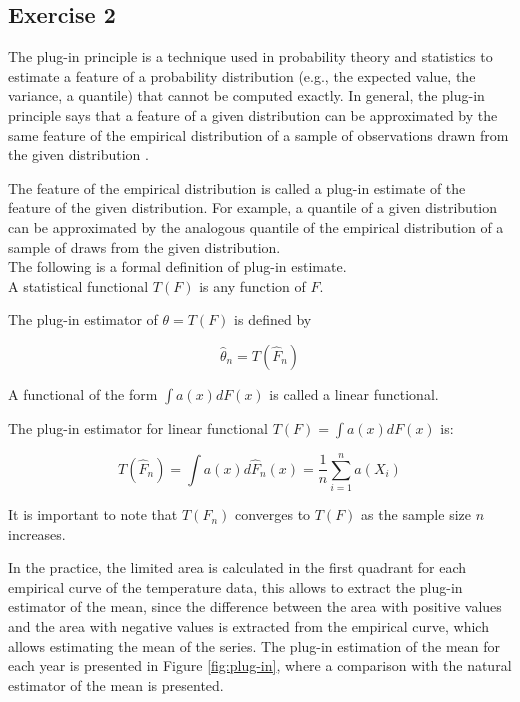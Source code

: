 \documentclass[11pt]{article}
\theoremstyle{definition}
\theoremstyle{remark}
\theoremstyle{remark}
\begin{document}
\subsection*{Exercise 2}

The plug-in principle is a technique used in probability theory and
statistics to estimate a feature of a probability distribution (e.g.,
the expected value, the variance, a quantile) that cannot be computed
exactly. In general, the plug-in principle says that a feature of a
given distribution can be approximated by the same feature of the
empirical distribution of a sample of observations drawn from the
given distribution \cite{van2000asymptotic}.

The feature of the empirical distribution is called a plug-in estimate
of the feature of the given distribution. For example, a quantile of a
given distribution can be approximated by the analogous quantile of
the empirical distribution of a sample of draws from the given
distribution.
\\

The following is a formal definition of plug-in estimate.
\\

A statistical functional $T(F)$ is any function of $F$.

The plug-in estimator of $\theta=T(F)$ is defined by

\[
  \widehat{\theta}_{n}=T\left(\widehat{F}_{n}\right)
\]

A functional of the form $\int a(x) d F(x)$ is called a linear
functional.

The plug-in estimator for linear functional $T(F)=\int a(x) d F(x)$
is:

\[
  T\left(\widehat{F}_{n}\right)=\int a(x) d
  \widehat{F}_{n}(x)=\frac{1}{n} \sum_{i=1}^{n} a\left(X_{i}\right)
\]

It is important to note that $T\left(F_{n}\right)$ converges to $T(F)$
as the sample size $n$ increases.

In the practice, the limited area is calculated in the first quadrant
for each empirical curve of the temperature data, this allows to
extract the plug-in estimator of the mean, since the difference
between the area with positive values and the area with negative
values is extracted from the empirical curve, which allows estimating
the mean of the series. The plug-in estimation of the mean for each
year is presented in Figure \ref{fig:plug-in}, where a comparison with
the natural estimator of the mean is presented.
\end{document}
